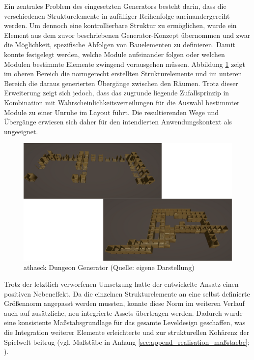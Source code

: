 Ein zentrales Problem des eingesetzten Generators besteht darin, dass die verschiedenen Strukturelemente in zufälliger Reihenfolge aneinandergereiht werden. Um dennoch eine kontrollierbare Struktur zu ermöglichen, wurde ein Element aus dem zuvor beschriebenen Generator-Konzept übernommen und zwar die Möglichkeit, spezifische Abfolgen von Bauelementen zu definieren. Damit konnte festgelegt werden, welche Module aufeinander folgen oder welchen Modulen bestimmte Elemente zwingend vorausgehen müssen. Abbildung \ref{fig:athaeck-dungeon-generator} zeigt im oberen Bereich die normgerecht erstellten Strukturelemente und im unteren Bereich die daraus generierten Übergänge zwischen den Räumen. Trotz dieser Erweiterung zeigt sich jedoch, dass das zugrunde liegende Zufallsprinzip in Kombination mit Wahrscheinlichkeitsverteilungen für die Auswahl bestimmter Module zu einer Unruhe im Layout führt. Die resultierenden Wege und Übergänge erwiesen sich daher für den intendierten Anwendungskontext als ungeeignet.

\begin{figure}[ht]
\centering
\includegraphics[width=1\linewidth]{content/pictures/FirstSteps06.png}
\caption{athaeck Dungeon Generator (Quelle: eigene Darstellung)}
\label{fig:athaeck-dungeon-generator}
\end{figure}

Trotz der letztlich verworfenen Umsetzung hatte der entwickelte Ansatz einen positiven Nebeneffekt. Da die einzelnen Strukturelemente an eine selbst definierte Größennorm angepasst werden mussten, konnte diese Norm im weiteren Verlauf auch auf zusätzliche, neu integrierte Assets übertragen werden. Dadurch wurde eine konsistente Maßstabsgrundlage für das gesamte Leveldesign geschaffen, was die Integration weiterer Elemente erleichterte und zur strukturellen Kohärenz der Spielwelt beitrug (vgl. Maßstäbe in Anhang \ref{sec:append_realisation_maßstaebe}; ).

